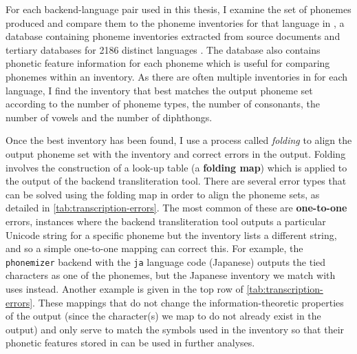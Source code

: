 For each backend-language pair used in this thesis, I examine the set of phonemes produced and compare them to the phoneme inventories for that language in \phoible, a database containing phoneme inventories extracted from source documents and tertiary databases for 2186 distinct languages \citep{phoible}. The database also contains phonetic feature information for each phoneme which is useful for comparing phonemes within an inventory. As there are often multiple inventories in \phoible for each language, I find the inventory that best matches the output phoneme set according to the number of phoneme types, the number of consonants, the number of vowels and the number of diphthongs.

Once the best inventory has been found, I use a process called \emph{folding} to align the output phoneme set with the inventory and correct errors in the output. Folding involves the construction of a look-up table (a \textbf{folding map}) which is applied to the output of the backend transliteration tool. There are several error types that can be solved using the folding map in order to align the phoneme sets, as detailed in \cref{tab:transcription-errors}. The most common of these are \textbf{one-to-one} errors, instances where the backend transliteration tool outputs a particular Unicode string for a specific phoneme but the inventory lists a different string, and so a simple one-to-one mapping can correct this. For example, the \texttt{phonemizer} backend with the \texttt{ja} language code (Japanese) outputs the tied characters  as one of the phonemes, but the Japanese inventory we match with uses  instead. Another example is given in the top row of \cref{tab:transcription-errors}. These mappings that do not change the information-theoretic properties of the output (since the character(s) we map to do not already exist in the output) and only serve to match the symbols used in the inventory so that their phonetic features stored in \phoible can be used in further analyses.

